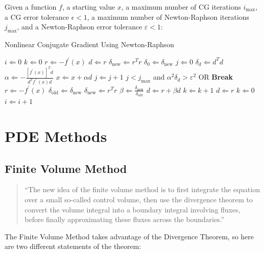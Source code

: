 \documentclass[11pt]{article}
\begin{document}
Given a function $f$, a starting value $x$, a maximum number of CG iterations $i_{\text{max}}$, a CG error tolerance $\epsilon<1$, a maximum number of Newton-Raphson iterations $j_{\text{max}}$, and a Newton-Raphson error tolerance $\varepsilon<1$:
\begin{algorithm}[H]
	\caption{Nonlinear Conjugate Gradient Using Newton-Raphson \cite{Shewchuk1994}\label{CongGradAlg}}
	\begin{algorithmic}
		\State $i\Leftarrow 0$
		\State $k\Leftarrow 0$
		\State $r\Leftarrow -f^{\prime}(x)$
		\State $d\Leftarrow r$
		\State $\delta_{\text{new}}\Leftarrow r^Tr$
		\State $\delta_0\Leftarrow\delta_{\text{new}}$
		\State $j\Leftarrow 0$
		\State $\delta_d\Leftarrow d^Td$
		\State $\alpha\Leftarrow -\frac{\left[f^{\prime}(x)\right]^Td}{d^Tf^{\prime\prime}(x)d}$
		\State $x\Leftarrow x+\alpha d$
		\State $j\Leftarrow j+1$
		\State $j<j_{\text{max}}$ and $\alpha^2\delta_d>\varepsilon^2$ OR \textbf{Break}
		\EndWhile
		\State $r\Leftarrow -f^{\prime}(x)$
		\State $\delta_{\text{old}}\Leftarrow\delta_{\text{new}}$
		\State $\delta_{\text{new}}\Leftarrow r^T r$
		\State $\beta\Leftarrow\frac{\delta_{\text{new}}}{\delta_{\text{old}}}$
		\State $d\Leftarrow r+\beta d$
		\State $k\Leftarrow k+1$
		\State $d\Leftarrow r$
		\State $k\Leftarrow 0$
		\EndIf
		\State $i\Leftarrow i+1$
		\EndWhile
	\end{algorithmic}
\end{algorithm}
\section{PDE Methods}
\subsection{Finite Volume Method}
\begin{quote}
	``The new idea of the {\color{tiananmen}finite volume method} is to first integrate the equation over a small so-called {\color{baystate}control volume}, then use the {\color{baystate}divergence theorem} to convert the volume integral into a {\color{baystate}boundary integral involving fluxes}, before finally approximating these fluxes across the boundaries.'' \cite{Gander2018}
\end{quote}

The Finite Volume Method takes advantage of the Divergence Theorem, so here are two different statements of the theorem:
\end{document}
